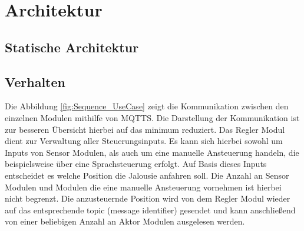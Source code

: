 \chapter{Architektur}
\label{cha:Architektur}

\section{Statische Architektur}

\section{Verhalten}


Die Abbildung \ref{fig:Sequence_UseCase} zeigt die Kommunikation zwischen den einzelnen Modulen mithilfe von MQTTS. Die Darstellung der Kommunikation ist zur besseren Übersicht hierbei auf das minimum reduziert. Das Regler Modul dient zur Verwaltung aller Steuerungsinputs. Es kann sich hierbei sowohl um Inputs von Sensor Modulen, als auch um eine manuelle Ansteuerung handeln, die beispielsweise über eine Sprachsteuerung erfolgt. Auf Basis dieses Inputs entscheidet es welche Position die Jalousie anfahren soll. Die Anzahl an Sensor Modulen und Modulen die eine manuelle Ansteuerung vornehmen ist hierbei nicht begrenzt. Die anzusteuernde Position wird von dem Regler Modul wieder auf das entsprechende topic (message identifier) gesendet und kann anschließend von einer beliebigen Anzahl an Aktor Modulen ausgelesen werden.

